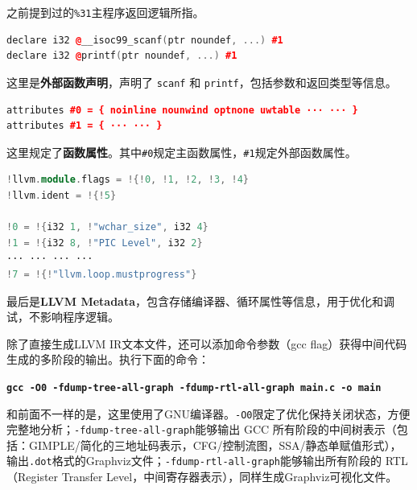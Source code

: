 \documentclass[UTF8,a4paper,10pt]{ctexart}
\begin{document}
之前提到过的\texttt{\%31}主程序返回逻辑所指。

\begin{lstlisting}[title=main.ll 段落 10,frame=trbl,language={C++}]
declare i32 @__isoc99_scanf(ptr noundef, ...) #1
declare i32 @printf(ptr noundef, ...) #1
\end{lstlisting}

这里是\textbf{外部函数声明}，声明了 \texttt{scanf} 和 \texttt{printf}，包括参数和返回类型等信息。

\begin{lstlisting}[title=main.ll 段落 11,frame=trbl,language={C++}]
attributes #0 = { noinline nounwind optnone uwtable ··· ··· }
attributes #1 = { ··· ··· }
\end{lstlisting}

这里规定了\textbf{函数属性}。其中\texttt{\#0}规定主函数属性，\texttt{\#1}规定外部函数属性。

\begin{lstlisting}[title=main.ll 段落 12,frame=trbl,language={C++}]
!llvm.module.flags = !{!0, !1, !2, !3, !4}
!llvm.ident = !{!5}

!0 = !{i32 1, !"wchar_size", i32 4}
!1 = !{i32 8, !"PIC Level", i32 2}
··· ··· ··· ···
!7 = !{!"llvm.loop.mustprogress"}
\end{lstlisting}

最后是\textbf{LLVM Metadata}，包含存储编译器、循环属性等信息，用于优化和调试，不影响程序逻辑。

\vspace{1em}

除了直接生成LLVM IR文本文件，还可以添加命令参数（gcc flag）获得中间代码生成的多阶段的输出。执行下面的命令：
\begin{center}
    \textcolor{deepblue}{\textbf{\texttt{\large{gcc -O0 -fdump-tree-all-graph -fdump-rtl-all-graph main.c -o main}}}}
\end{center}

和前面不一样的是，这里使用了GNU编译器。\texttt{-O0}限定了优化保持关闭状态，方便完整地分析；\texttt{-fdump-tree-all-graph}能够输出 GCC 所有阶段的中间树表示（包括：GIMPLE/简化的三地址码表示，CFG/控制流图，SSA/静态单赋值形式），输出\texttt{.dot}格式的Graphviz文件；\texttt{-fdump-rtl-all-graph}能够输出所有阶段的 RTL（Register Transfer Level，中间寄存器表示），同样生成Graphviz可视化文件。
\end{document}
